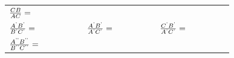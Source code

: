 {\begin{tabular}[t]{|l|l|l|}
                \begin{math}\frac{CB}{AC}=\phantom{\rule{42.67912pt}{0ex}}\end{math}
     \tabularnewline\cline{1-1}\cline{2-2}\cline{3-3}
    
    
        
                \begin{math}\frac{{A}^{\text{'}}{B}^{\text{'}}}{{B}^{\text{'}}{C}^{\text{'}}}=\phantom{\rule{42.67912pt}{0ex}}\end{math}
               &
    
    
        
                \begin{math}\frac{{A}^{\text{'}}{B}^{\text{'}}}{{A}^{\text{'}}{C}^{\text{'}}}=\phantom{\rule{42.67912pt}{0ex}}\end{math}
               &
    
    
        
                \begin{math}\frac{{C}^{\text{'}}{B}^{\text{'}}}{{A}^{\text{'}}{C}^{\text{'}}}=\phantom{\rule{42.67912pt}{0ex}}\end{math}
     \tabularnewline\cline{1-1}\cline{2-2}\cline{3-3}
    
    
        
                \begin{math}\frac{{A}^{\text{'}\text{'}}{B}^{\text{'}\text{'}}}{{B}^{\text{'}\text{'}}{C}^{\text{'}\text{'}}}=\phantom{\rule{42.67912pt}{0ex}}\end{math}
               &
    

\end{tabular}}
